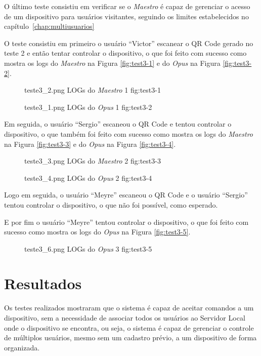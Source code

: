 O último teste consistiu em verificar se o \emph{Maestro} é capaz de gerenciar o acesso de um dispositivo para usuários visitantes, seguindo os limites
estabelecidos no capítulo~\ref{chap:multiusuarios} 

O teste consistiu em primeiro o usuário ``Victor'' escanear o QR Code gerado no teste 2 e então tentar controlar o dispositivo, o que foi feito com sucesso
como mostra os logs do \emph{Maestro} na Figura \ref{fig:test3-1} e do \emph{Opus} na Figura \ref{fig:test3-2}.

\begin{figure}[h!]
    {teste3_2.png}
    {LOGs do \emph{Maestro} 1}
    {fig:test3-1}
\end{figure}

\begin{figure}[h!]
    {teste3_1.png}
    {LOGs do \emph{Opus} 1}
    {fig:test3-2}
\end{figure}

Em seguida, o usuário ``Sergio'' escaneou o QR Code e tentou controlar o dispositivo, o que também foi feito com sucesso como mostra os
logs do \emph{Maestro} na Figura \ref{fig:test3-3} e do \emph{Opus} na Figura \ref{fig:test3-4}.

\begin{figure}[h!]
    {teste3_3.png}
    {LOGs do \emph{Maestro} 2}
    {fig:test3-3}
\end{figure}

\begin{figure}[h!]
    {teste3_4.png}
    {LOGs do \emph{Opus} 2}
    {fig:test3-4}
\end{figure}

Logo em seguida, o usuário ``Meyre'' escaneou o QR Code e o usuário ``Sergio'' tentou controlar o dispositivo, o que não foi possível, como esperado.

E por fim o usuário ``Meyre'' tentou controlar o dispositivo, o que foi feito com sucesso como mostra os logs do \emph{Opus} na Figura \ref{fig:test3-5}.

\begin{figure}[h!]
    {teste3_6.png}
    {LOGs do \emph{Opus} 3}
    {fig:test3-5}
\end{figure}

\section{Resultados}

Os testes realizados mostraram que o sistema é capaz de aceitar comandos a um dispositivo, sem a necessidade de associar todos os usuários ao
Servidor Local onde o dispositivo se encontra, ou seja, o sistema é capaz de gerenciar o controle de múltiplos usuários, mesmo sem um cadastro prévio,
a um dispositivo de forma organizada.